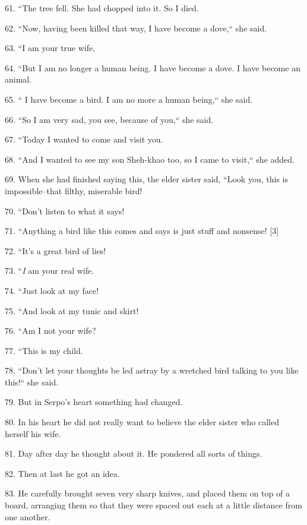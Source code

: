 {\LARGE{}61. ``The tree fell. She had chopped into it. So I died. }

{\LARGE{}62. ``Now, having been killed that way, I have become a dove,``
she said.}

{\LARGE{}63.  ``I am your true wife,}

{\LARGE{}64. ``But I am no longer a human being. I have become a dove.
I have become an animal.}

{\LARGE{}65. `` I have become a bird. I am no more a human being,``
she said. }

{\LARGE{}66. ``So I am very sad, you see, because of you,`` she
said. }

{\LARGE{}67. ``Today I wanted to come and visit you. }

{\LARGE{}68. ``And I wanted to see my son Sheh-khao too, so I came to visit,``
she added. }

{\LARGE{}69.  When she had finished saying this, the elder sister said, ``Look
you, this is impossible--that filthy, miserable bird! }

{\LARGE{}70.  ``Don't listen to what it says! }

{\LARGE{}71. ``Anything a bird like this comes and says is just stuff and
nonsense! [3]}

{\LARGE{}72. ``It's a great bird of lies! }

{\LARGE{}73. ``}{\LARGE{}\textit{I}}{\LARGE{} am your real wife.}

{\LARGE{}74. ``Just look at my face! }

{\LARGE{}75.  ``And look at my tunic and skirt! }

{\LARGE{}76.  ``Am I not your wife? }

{\LARGE{}77.  ``This is my child. }

{\LARGE{}78.  ``Don't let your thoughts be led astray by a wretched bird
talking to you like this!`` she said.}

{\LARGE{}79.  But in Serpo's heart something had changed. }

{\LARGE{}80.  In his heart he did not really want to believe the elder sister who
called herself his wife. }

{\LARGE{}81. Day after day he thought about it. He pondered all sorts of things.
}

{\LARGE{}82. Then at last he got an idea. }

{\LARGE{}83. He carefully brought seven very sharp knives, and placed them on top
of a board, arranging them so that they were spaced out each at a little distance
from one another. }

